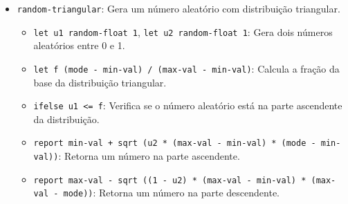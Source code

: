 \documentclass{article}
\begin{document}
\begin{itemize}
    \item \texttt{random-triangular}: Gera um número aleatório com distribuição triangular.
    \begin{itemize}
        \item \texttt{let u1 random-float 1}, \texttt{let u2 random-float 1}: Gera dois números aleatórios entre 0 e 1.
        \item \texttt{let f (mode - min-val) / (max-val - min-val)}: Calcula a fração da base da distribuição triangular.
        \item \texttt{ifelse u1 <= f}: Verifica se o número aleatório está na parte ascendente da distribuição.
        \item \texttt{report min-val + sqrt (u2 * (max-val - min-val) * (mode - min-val))}: Retorna um número na parte ascendente.
        \item \texttt{report max-val - sqrt ((1 - u2) * (max-val - min-val) * (max-val - mode))}: Retorna um número na parte descendente.
    \end{itemize}
\end{itemize}
\end{document}
